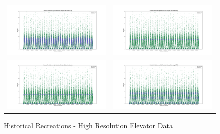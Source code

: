 \begin{figure}
  \begin{tabular}{cc}
    {\includegraphics[width = 3in]{images/results/Historical_high_res_elevator_Duckett.png}} &
    {\includegraphics[width = 3in]{images/results/Historical_high_res_elevator_FreMEn.png}} \\
    {\includegraphics[width = 3in]{images/results/Historical_high_res_elevator_Gaussian.png}} &
    {\includegraphics[width = 3in]{images/results/Historical_high_res_elevator_HyT-EM.png}} \\
  \end{tabular}
  \caption{Historical Recreations - High Resolution Elevator Data}
  \label{figure:Historical_Recreations_-_High_Resolution_Elevator_Data}
\end{figure}

